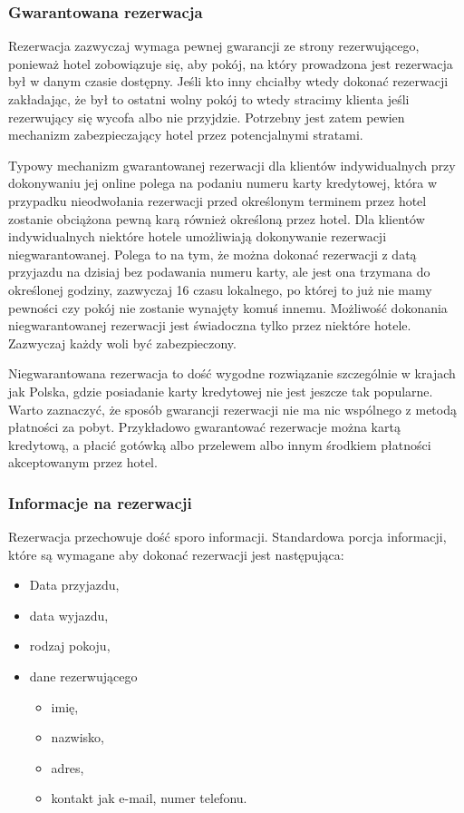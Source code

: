 \documentclass[12pt, a4paper]{article}
\begin{document}
\subsubsection{Gwarantowana rezerwacja}
Rezerwacja zazwyczaj wymaga pewnej gwarancji ze strony rezerwującego, ponieważ
hotel zobowiązuje się, aby pokój, na który prowadzona jest rezerwacja
był w danym czasie dostępny. Jeśli kto inny chciałby wtedy dokonać rezerwacji 
zakładając, że był to ostatni wolny pokój to wtedy stracimy klienta jeśli 
rezerwujący się wycofa albo nie przyjdzie. Potrzebny jest zatem pewien  
mechanizm zabezpieczający hotel przez potencjalnymi stratami. 

Typowy mechanizm gwarantowanej rezerwacji dla klientów indywidualnych przy dokonywaniu 
jej online polega na podaniu numeru karty kredytowej, która w przypadku 
nieodwołania rezerwacji przed określonym terminem przez hotel zostanie obciążona pewną karą 
również określoną przez hotel. Dla klientów indywidualnych niektóre hotele 
umożliwiają dokonywanie rezerwacji niegwarantowanej. Polega to na tym, 
że można dokonać rezerwacji z datą przyjazdu na dzisiaj bez podawania 
numeru karty, ale jest ona trzymana do określonej godziny, 
zazwyczaj 16 czasu lokalnego, po której to już nie mamy pewności 
czy pokój nie zostanie wynajęty komuś innemu. Możliwość dokonania
niegwarantowanej rezerwacji jest świadoczna tylko przez niektóre hotele.
Zazwyczaj każdy woli być zabezpieczony. 

Niegwarantowana rezerwacja to dość wygodne rozwiązanie szczególnie w krajach jak
Polska, gdzie posiadanie karty kredytowej nie jest jeszcze tak popularne. Warto zaznaczyć, że sposób gwarancji rezerwacji 
nie ma nic wspólnego z metodą płatności za pobyt. Przykładowo gwarantować
rezerwacje można kartą kredytową, a płacić gotówką albo przelewem albo innym
środkiem płatności akceptowanym przez hotel.


\subsubsection{Informacje na rezerwacji}
\label{informacje_na_rezerwacji}
Rezerwacja przechowuje dość sporo informacji. Standardowa porcja informacji, 
które są wymagane aby dokonać rezerwacji jest następująca:
\begin{itemize}
  \item Data przyjazdu,
  \item data wyjazdu,
  \item rodzaj pokoju,
  \item dane rezerwującego
  \begin{itemize}
    \item imię,
    \item nazwisko, 
    \item adres, 
    \item kontakt jak e-mail, numer telefonu.
  \end{itemize} 
\end{itemize}
\end{document}
